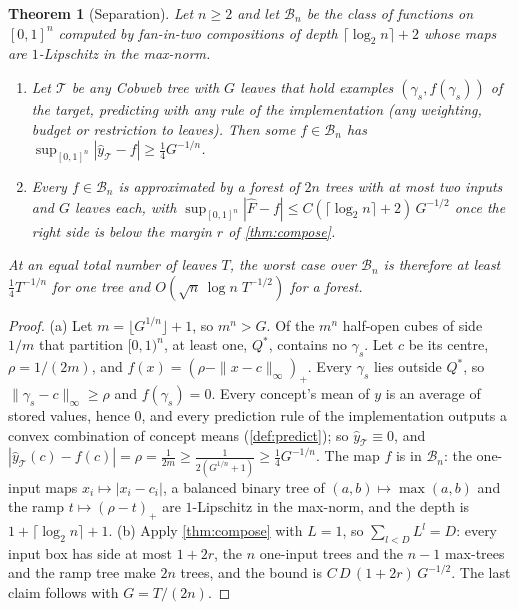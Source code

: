 \documentclass[11pt]{article}
\newtheorem{theorem}{Theorem}
\theoremstyle{definition}
\theoremstyle{remark}
\newcommand{\T}{\mathcal{T}}
\newcommand{\hy}{\hat{y}}
\begin{document}
\begin{theorem}[Separation]\label{thm:separation}
Let $n\ge2$ and let $\mathcal B_n$ be the class of functions on $[0,1]^n$ computed by fan-in-two
compositions of depth $\lceil\log_2n\rceil+2$ whose maps are $1$-Lipschitz in the max-norm.
\begin{enumerate}[label=(\alph*),leftmargin=*,noitemsep]
\item Let $\T$ be any Cobweb tree with $G$ leaves that hold examples $(\gamma_s,f(\gamma_s))$ of the
  target, predicting with any rule of the implementation (any weighting, budget or
  restriction to leaves).  Then some $f\in\mathcal B_n$ has $\sup_{[0,1]^n}|\hy_\T-f|\ge
  \tfrac14G^{-1/n}$.
\item Every $f\in\mathcal B_n$ is approximated by a forest of $2n$ trees with at most two inputs
  and $G$ leaves each, with $\sup_{[0,1]^n}|\hat F-f|\le C(\lceil\log_2n\rceil+2)\,G^{-1/2}$ once
  the right side is below the margin $r$ of \cref{thm:compose}.
\end{enumerate}
At an equal total number of leaves $T$, the worst case over $\mathcal B_n$ is therefore at least
$\tfrac14T^{-1/n}$ for one tree and $O(\sqrt n\,\log n\;T^{-1/2})$ for a forest.
\end{theorem}

\begin{proof}
(a) Let $m=\lfloor G^{1/n}\rfloor+1$, so $m^n>G$.  Of the $m^n$ half-open cubes of side $1/m$ that
partition $[0,1)^n$, at least one, $Q^*$, contains no $\gamma_s$.  Let $c$ be its centre,
$\rho=1/(2m)$, and $f(x)=(\rho-\|x-c\|_\infty)_+$.  Every $\gamma_s$ lies outside $Q^*$, so
$\|\gamma_s-c\|_\infty\ge\rho$ and $f(\gamma_s)=0$.  Every concept's mean of $y$ is an average of
stored values, hence $0$, and every prediction rule of the implementation outputs a convex
combination of concept means (\cref{def:predict}); so $\hy_\T\equiv0$, and
$|\hy_\T(c)-f(c)|=\rho=\frac1{2m}\ge\frac1{2(G^{1/n}+1)}\ge\frac14G^{-1/n}$.  The map $f$ is in
$\mathcal B_n$: the one-input maps $x_i\mapsto|x_i-c_i|$, a balanced binary tree of
$(a,b)\mapsto\max(a,b)$ and the ramp $t\mapsto(\rho-t)_+$ are $1$-Lipschitz in the max-norm, and
the depth is $1+\lceil\log_2n\rceil+1$.
(b) Apply \cref{thm:compose} with $L=1$, so $\sum_{l<D}L^l=D$: every input box has side at most
$1+2r$, the $n$ one-input trees and the $n-1$ max-trees and the ramp tree make $2n$ trees, and
the bound is $C\,D\,(1+2r)\,G^{-1/2}$.  The last claim follows with $G=T/(2n)$.
\end{proof}
\end{document}

